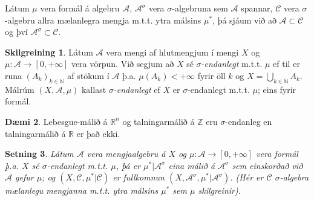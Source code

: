 \documentclass[a4paper,icelandic,11pt]{book}
\theoremstyle{plain}      \newtheorem{setn}{Setning}[chapter]
\theoremstyle{definition} \newtheorem{skilgr}[setn]{Skilgreining}
\newtheorem{daemi}[setn]{Dæmi}
\theoremstyle{remark}     \newtheorem*{ath}{Athugasemd}
\newcommand{\R}{\mathbb R}
\newcommand{\N}{\mathbb N}
\newcommand{\Z}{\mathbb Z}
\begin{document}
Látum $\mu$ vera formál á algebru $\mathcal A$, $\mathcal A^\sigma$ vera
$\sigma$-algebruna sem $\mathcal A$ spannar, $\mathcal C$ vera
$\sigma$-algebru allra mælanlegra mengja m.t.t. ytra málsins $\mu^*$, þá
sjáum við að $\mathcal A\subset\mathcal C$ og því $\mathcal
A^\sigma\subset\mathcal C$.
\begin{skilgr}
  Látum $\mathcal A$ vera mengi af hlutmengjum í mengi $X$ og
  $\mu:\mathcal A\to[0,+\infty]$ vera vörpun. Við segjum að $X$ sé
  \emph{$\sigma$-endanlegt}
  m.t.t. $\mu$ ef til er runa $(A_k)_{k\in\N}$ af stökum í $\mathcal
  A$ þ.a. $\mu(A_k)< +\infty$ fyrir öll $k$ og $X = \bigcup_{k\in\N}
  A_k$.  Málrúm $(X,\mathcal A,\mu)$ kallast
  \emph{$\sigma$-endanlegt}
  ef $X$ er $\sigma$-endanlegt m.t.t. $\mu$; eins fyrir formál.
\end{skilgr}
\begin{daemi}
  Lebesgue-málið á $\R^n$ og talningarmálið á $\Z$ eru
  $\sigma$-endanleg en talningarmálið á $\R$ er það ekki.
\end{daemi}
\begin{setn}
  Látum $\mathcal A$ vera mengjaalgebru á $X$ og $\mu:\mathcal
  A\to[0,+\infty]$ vera formál þ.a. $X$ sé $\sigma$-endanlegt m.t.t.
  $\mu$, þá er $\mu^*|\mathcal A^\sigma$ eina málið á $\mathcal
  A^\sigma$ sem einskorðað við $\mathcal A$ gefur $\mu$; og
  $(X,\mathcal C,\mu^*|\mathcal C)$ er fullkomnun $(X,\mathcal
  A^\sigma,\mu^*|\mathcal A^\sigma)$. (Hér er $\mathcal C$
  $\sigma$-algebra mælanlegu mengjanna m.t.t. ytra málsins $\mu^*$ sem
  $\mu$ skilgreinir).
\end{setn}
\end{document}
